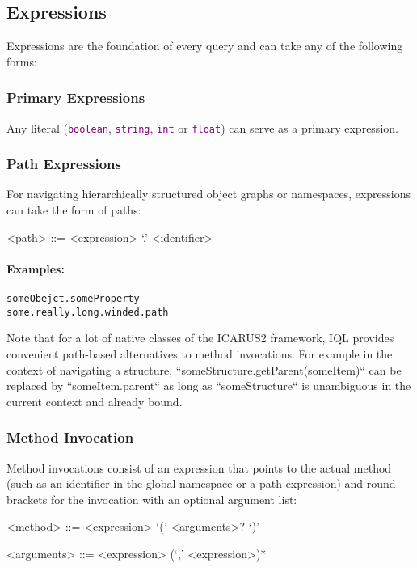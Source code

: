 \documentclass[11pt]{article}
\newcommand{\iql}{IQL\xspace}
\newcommand{\keyword}[1]{\textcolor{purple}{\texttt{#1}}}
\begin{document}
\subsection{Expressions}
\label{sec:expressions}

Expressions are the foundation of every query and can take any of the following forms:

\subsubsection{Primary Expressions}
\label{sec:primary-expressions}

Any literal (\keyword{boolean}, \keyword{string}, \keyword{int} or \keyword{float}) can serve as a primary expression.

\subsubsection{Path Expressions}
\label{sec:path-expressions}

For navigating hierarchically structured object graphs or namespaces, expressions can take the form of paths:
\begin{grammar}	
<path> ::= <expression> `.' <identifier> 	
\end{grammar}

\paragraph{Examples:}

\begin{verbatim}
someObejct.someProperty
some.really.long.winded.path
\end{verbatim}

\noindent Note that for a lot of native classes of the ICARUS2 framework, \iql provides convenient path-based alternatives to method invocations. For example in  the context of navigating a structure, ``someStructure.getParent(someItem)`` can be replaced by ``someItem.parent`` as long as ``someStructure`` is unambiguous in the current context and already bound.

\subsubsection{Method Invocation}
\label{sec:method-invocations}

Method invocations consist of an expression that points to the actual method (such as an identifier in the global namespace or a path expression) and round brackets for the invocation with an optional argument list:
\begin{grammar}	
	<method> ::= <expression> `(' <arguments>? `)'
	
	<arguments> ::= <expression> (`,' <expression>)*
\end{grammar}
\end{document}
